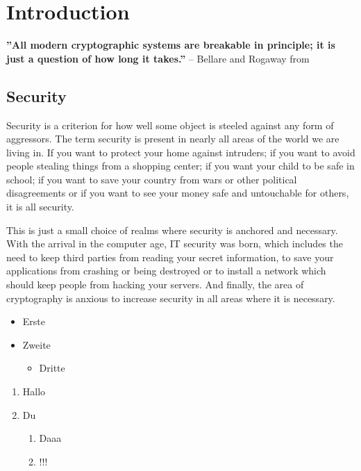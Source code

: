 \chapter{Introduction}
\label{introduction}
\begin{center}
\textbf{''All modern cryptographic systems are breakable in principle; it is just a question of how long it takes.''} -- Bellare and Rogaway from \cite{Bellare05}\newline
\end{center}

\section*{Security}
Security is a criterion for how well some object is steeled against any form of aggressors. The term security is present in nearly all areas of the world
we are living in. If you want to protect your home against intruders; if you want to avoid people stealing things from a shopping center; if you want
your child to be safe in school; if you want to save your country from wars or other political
disagreements or if you want to see your money safe and untouchable for others, it is all security.

This is just a small choice of realms where security is anchored and necessary. With the arrival in the computer age, IT security was born,
which includes the need to keep third parties from reading your secret information, to save your applications from crashing or being destroyed or to
install a network which should keep people from hacking your servers. And finally, the area of cryptography is anxious to increase security in
all areas where it is necessary.

\begin{itemize}
	\item Erste
	\item Zweite
	\begin{itemize}
		\item Dritte
	\end{itemize}
\end{itemize}

\begin{enumerate}
	\item Hallo
	\item Du
	\begin{enumerate}
		\item Daaa
		\item !!!
	\end{enumerate}
\end{enumerate}

